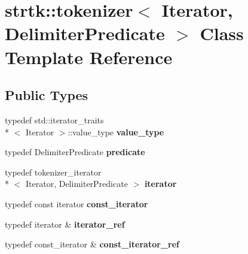 \hypertarget{classstrtk_1_1tokenizer}{\section{strtk\-:\-:tokenizer$<$ Iterator, Delimiter\-Predicate $>$ Class Template Reference}
\label{classstrtk_1_1tokenizer}
}
\subsection*{Public Types}
\begin{DoxyCompactItemize}
\item 
\hypertarget{classstrtk_1_1tokenizer_a173163d8a3858cb8d116890b71e0b007}{typedef std\-::iterator\-\_\-traits\\*
$<$ Iterator $>$\-::value\-\_\-type {\bfseries value\-\_\-type}}\label{classstrtk_1_1tokenizer_a173163d8a3858cb8d116890b71e0b007}

\item 
\hypertarget{classstrtk_1_1tokenizer_a051782c35f4796b651c5565c1046d167}{typedef Delimiter\-Predicate {\bfseries predicate}}\label{classstrtk_1_1tokenizer_a051782c35f4796b651c5565c1046d167}

\item 
\hypertarget{classstrtk_1_1tokenizer_a202840c8d7f39e78e0c485869e092a52}{typedef tokenizer\-\_\-iterator\\*
$<$ Iterator, Delimiter\-Predicate $>$ {\bfseries iterator}}\label{classstrtk_1_1tokenizer_a202840c8d7f39e78e0c485869e092a52}

\item 
\hypertarget{classstrtk_1_1tokenizer_a9f01f2d5e5af95d332d34c1ebb87821a}{typedef const iterator {\bfseries const\-\_\-iterator}}\label{classstrtk_1_1tokenizer_a9f01f2d5e5af95d332d34c1ebb87821a}

\item 
\hypertarget{classstrtk_1_1tokenizer_a8b505260404321085e92ca6dd48a72fd}{typedef iterator \& {\bfseries iterator\-\_\-ref}}\label{classstrtk_1_1tokenizer_a8b505260404321085e92ca6dd48a72fd}

\item 
\hypertarget{classstrtk_1_1tokenizer_a3e2cc5da76a252422206bfe8ca0cd98c}{typedef const\-\_\-iterator \& {\bfseries const\-\_\-iterator\-\_\-ref}}\label{classstrtk_1_1tokenizer_a3e2cc5da76a252422206bfe8ca0cd98c}

\end{DoxyCompactItemize}
